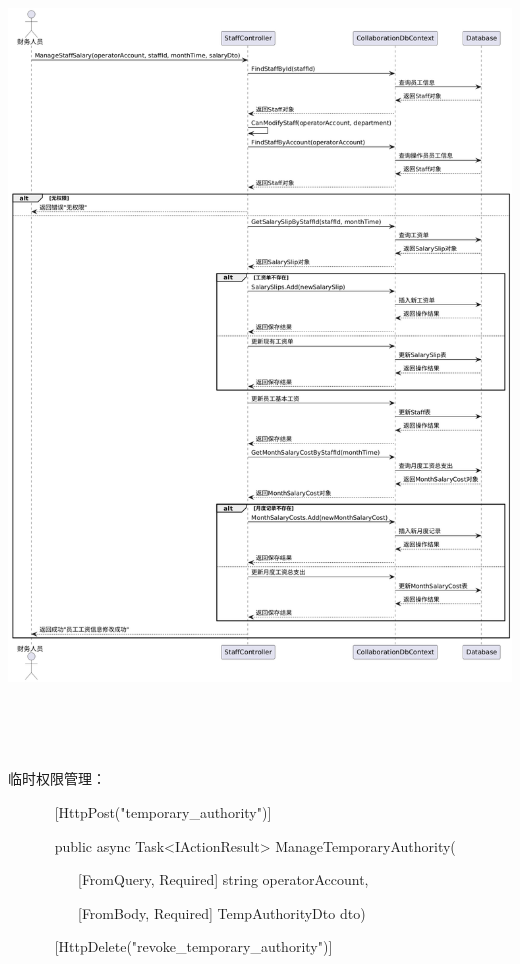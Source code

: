 \documentclass[]{article}
\begin{document}
\includegraphics[width=6.32153in,height=8.45556in]{media/media/image18.png}

临时权限管理：

~ ~ ~ ~ {[}HttpPost("temporary\_authority"){]}

~ ~ ~ ~ public async Task\textless{}IActionResult\textgreater{}
ManageTemporaryAuthority(

~ ~ ~ ~ ~ ~ {[}FromQuery, Required{]} string operatorAccount,

~ ~ ~ ~ ~ ~ {[}FromBody, Required{]} TempAuthorityDto dto)

~ ~ ~ ~ {[}HttpDelete("revoke\_temporary\_authority"){]}
\end{document}
